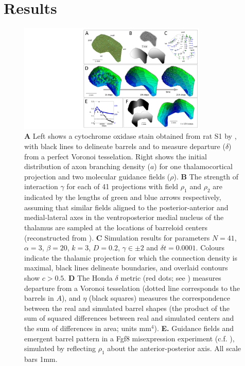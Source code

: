 \documentclass[9pt,twocolumn,twoside,lineno]{pnas-new}
\begin{document}
\section*{Results}

\begin{figure}
\begin{center}
\includegraphics[width=0.8\textwidth]{./MainFig.png}
\end{center}
\caption{\textbf{A} Left shows a cytochrome oxidase stain obtained from rat S1 by \cite{zheng_signal_2001}, with black lines to delineate barrels and to measure departure ($\delta$) from a perfect Voronoi tesselation. Right shows the initial distribution of axon branching density ($a$) for one thalamocortical projection and two molecular guidance fields ($\rho$). \textbf{B} The strength of interaction $\gamma$ for each of 41 projections with field $\rho_1$ and $\rho_2$ are indicated by the lengths of green and blue arrows respectively, assuming that similar fields aligned to the posterior-anterior and medial-lateral axes in the ventroposterior medial nucleus of the thalamus are sampled at the locations of barreloid centers (reconstructed from \cite{haidarliu_size_2001}). \textbf{C} Simulation results for parameters $N=41$, $\alpha=3$, $\beta=20$, $k=3$, $D=0.2$, $\gamma\in\pm 2$ and $\delta{t}=0.0001$. Colours indicate the thalamic projection for which the connection density is maximal, black lines delineate boundaries, and overlaid contours show $c>0.5$. \textbf{D} The Honda $\delta$ metric (red dots; see \cite{senft_mouse_1991}) measures departure from a Voronoi tesselation (dotted line corresponds to the barrels in $A$), and $\eta$ (black squares) measures the correspondence between the real and simulated barrel shapes (the product of the sum of squared differences between real and simulated centers and the sum of differences in area; units mm$^4$). \textbf{E.} Guidance fields and emergent barrel pattern in a Fgf8 misexpression experiment (c.f. \cite{assimacopoulos_fibroblast_2012}), simulated by reflecting $\rho_1$ about the anterior-posterior axis. All scale bars 1mm.}
\label{fig:main}
\end{figure}
\end{document}
